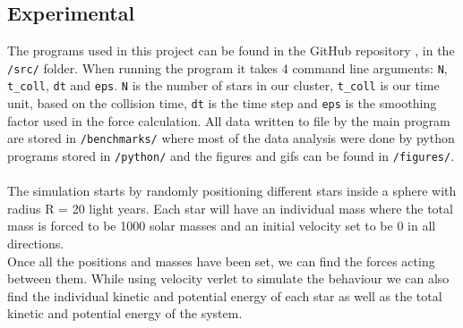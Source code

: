 \documentclass{article}
\begin{document}
\subsection{Experimental}
The programs used in this project can be found in the GitHub repository \cite{GitHub5}, in the \texttt{/src/} folder. When running the program it takes 4 command line arguments: \texttt{N}, \texttt{t\_coll}, \texttt{dt} and \texttt{eps}. \texttt{N} is the number of stars in our cluster, \texttt{t\_coll} is our time unit, based on the collision time, \texttt{dt} is the time step and \texttt{eps} is the smoothing factor used in the force calculation. All data written to file by the main program are stored in \texttt{/benchmarks/} where most of the data analysis were done by python programs stored in \texttt{/python/} and the figures and gifs can be found in \texttt{/figures/}. \\ \\
The simulation starts by randomly positioning different stars inside a sphere with radius R = 20 light years. Each star will have an individual mass where the total mass is forced to be 1000 solar masses and an initial velocity set to be 0 in all directions. \\
Once all the positions and masses have been set, we can find the forces acting between them. While using velocity verlet to simulate the behaviour we can also find the individual kinetic and potential energy of each star as well as the total kinetic and potential energy of the system. 
\end{document}
